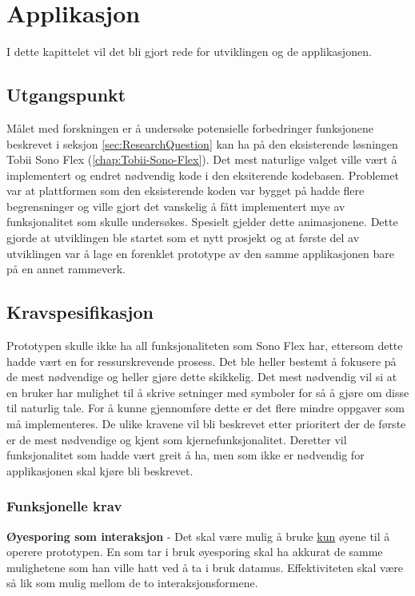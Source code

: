  
 
\chapter{Applikasjon} 
 
 
I dette kapittelet vil det bli gjort rede for utviklingen og de applikasjonen. 
 
 
\section{Utgangspunkt} 
\label{sec:utgangspunkt} 
 
 
Målet med forskningen er å undersøke potensielle forbedringer funksjonene beskrevet i seksjon \ref{sec:ResearchQuestion} kan ha på den eksisterende løsningen Tobii Sono Flex (\ref{chap:Tobii-Sono-Flex}). Det mest naturlige valget ville vært å implementert og endret nødvendig kode i den eksiterende kodebasen. Problemet var at plattformen som den eksisterende koden var bygget på hadde flere begrensninger og ville gjort det vanskelig å fått implementert mye av funksjonalitet som skulle undersøkes. Spesielt gjelder dette animasjonene. Dette gjorde at utviklingen ble startet som et nytt prosjekt og at første del av utviklingen var å lage en forenklet prototype av den samme applikasjonen bare på en annet rammeverk. 
 
 
\section{Kravspesifikasjon} 
 
Prototypen skulle ikke ha all funksjonaliteten som Sono Flex har, ettersom dette hadde vært en for ressurskrevende prosess. Det ble heller bestemt å fokusere på de mest nødvendige og heller gjøre dette skikkelig. Det mest nødvendig vil si at en bruker har mulighet til å skrive setninger med symboler for så å gjøre om disse til naturlig tale. For å kunne gjennomføre dette er det flere mindre oppgaver som må implementeres. De ulike kravene vil bli beskrevet etter prioritert der de første er de mest nødvendige og kjent som kjernefunksjonalitet. Deretter vil funksjonalitet som hadde vært greit å ha, men som ikke er nødvendig for applikasjonen skal kjøre bli beskrevet.  

 
\subsection{Funksjonelle krav} 
 
 
\textbf{Øyesporing som interaksjon} - Det skal være mulig å bruke \underline{kun} øyene til å operere prototypen. En som tar i bruk øyesporing skal ha akkurat de samme mulighetene som han ville hatt ved å ta i bruk datamus. Effektiviteten skal være så lik som mulig mellom de to interaksjonsformene. 
 
